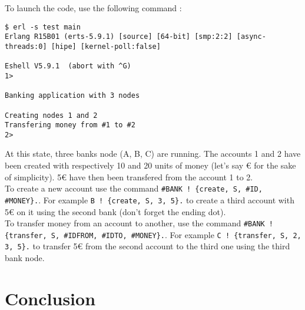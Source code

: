 \documentclass[11pt,english,a4paper]{article}
\begin{document}
To launch the code, use the following command :
\begin{verbatim}
$ erl -s test main
Erlang R15B01 (erts-5.9.1) [source] [64-bit] [smp:2:2] [async-threads:0] [hipe] [kernel-poll:false]

Eshell V5.9.1  (abort with ^G)
1> 

Banking application with 3 nodes

Creating nodes 1 and 2
Transfering money from #1 to #2
2>
\end{verbatim}
At this state, three banks node (A, B, C) are running.
The accounts 1 and 2 have been created with respectively 10 and 20 units of money (let's say € for the sake of simplicity).
5€ have then been transfered from the account 1 to 2.\\

To create a new account use the command \texttt{\#BANK ! \{create, S, \#ID, \#MONEY\}.}.
For example \texttt{B ! \{create, S, 3, 5\}.} to create a third account with 5€ on it using the second bank (don't forget the ending dot).\\

To transfer money from an account to another, use the command  \texttt{\#BANK ! \{transfer, S, \#IDFROM, \#IDTO, \#MONEY\}.}.
For example \texttt{C ! \{transfer, S, 2, 3, 5\}.} to transfer 5€ from the second account to the third one using the third bank node.


\section{Conclusion}
 
\end{document}
